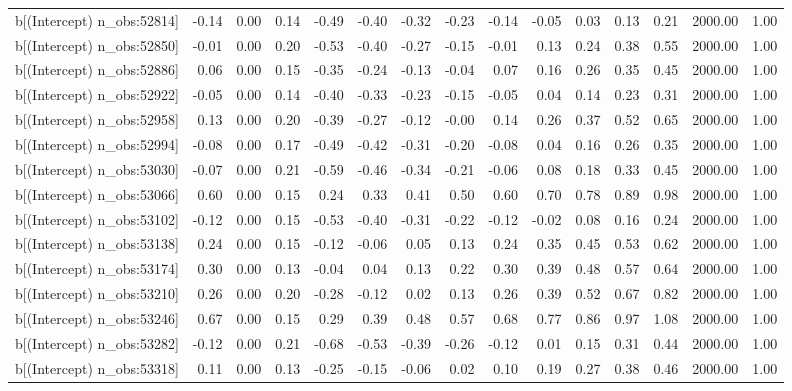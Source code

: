 \begin{table}[ht]
\begin{tabular}{rrrrrrrrrrrrrrr}
  b[(Intercept) n\_obs:52814] & -0.14 & 0.00 & 0.14 & -0.49 & -0.40 & -0.32 & -0.23 & -0.14 & -0.05 & 0.03 & 0.13 & 0.21 & 2000.00 & 1.00 \\ 
  b[(Intercept) n\_obs:52850] & -0.01 & 0.00 & 0.20 & -0.53 & -0.40 & -0.27 & -0.15 & -0.01 & 0.13 & 0.24 & 0.38 & 0.55 & 2000.00 & 1.00 \\ 
  b[(Intercept) n\_obs:52886] & 0.06 & 0.00 & 0.15 & -0.35 & -0.24 & -0.13 & -0.04 & 0.07 & 0.16 & 0.26 & 0.35 & 0.45 & 2000.00 & 1.00 \\ 
  b[(Intercept) n\_obs:52922] & -0.05 & 0.00 & 0.14 & -0.40 & -0.33 & -0.23 & -0.15 & -0.05 & 0.04 & 0.14 & 0.23 & 0.31 & 2000.00 & 1.00 \\ 
  b[(Intercept) n\_obs:52958] & 0.13 & 0.00 & 0.20 & -0.39 & -0.27 & -0.12 & -0.00 & 0.14 & 0.26 & 0.37 & 0.52 & 0.65 & 2000.00 & 1.00 \\ 
  b[(Intercept) n\_obs:52994] & -0.08 & 0.00 & 0.17 & -0.49 & -0.42 & -0.31 & -0.20 & -0.08 & 0.04 & 0.16 & 0.26 & 0.35 & 2000.00 & 1.00 \\ 
  b[(Intercept) n\_obs:53030] & -0.07 & 0.00 & 0.21 & -0.59 & -0.46 & -0.34 & -0.21 & -0.06 & 0.08 & 0.18 & 0.33 & 0.45 & 2000.00 & 1.00 \\ 
  b[(Intercept) n\_obs:53066] & 0.60 & 0.00 & 0.15 & 0.24 & 0.33 & 0.41 & 0.50 & 0.60 & 0.70 & 0.78 & 0.89 & 0.98 & 2000.00 & 1.00 \\ 
  b[(Intercept) n\_obs:53102] & -0.12 & 0.00 & 0.15 & -0.53 & -0.40 & -0.31 & -0.22 & -0.12 & -0.02 & 0.08 & 0.16 & 0.24 & 2000.00 & 1.00 \\ 
  b[(Intercept) n\_obs:53138] & 0.24 & 0.00 & 0.15 & -0.12 & -0.06 & 0.05 & 0.13 & 0.24 & 0.35 & 0.45 & 0.53 & 0.62 & 2000.00 & 1.00 \\ 
  b[(Intercept) n\_obs:53174] & 0.30 & 0.00 & 0.13 & -0.04 & 0.04 & 0.13 & 0.22 & 0.30 & 0.39 & 0.48 & 0.57 & 0.64 & 2000.00 & 1.00 \\ 
  b[(Intercept) n\_obs:53210] & 0.26 & 0.00 & 0.20 & -0.28 & -0.12 & 0.02 & 0.13 & 0.26 & 0.39 & 0.52 & 0.67 & 0.82 & 2000.00 & 1.00 \\ 
  b[(Intercept) n\_obs:53246] & 0.67 & 0.00 & 0.15 & 0.29 & 0.39 & 0.48 & 0.57 & 0.68 & 0.77 & 0.86 & 0.97 & 1.08 & 2000.00 & 1.00 \\ 
  b[(Intercept) n\_obs:53282] & -0.12 & 0.00 & 0.21 & -0.68 & -0.53 & -0.39 & -0.26 & -0.12 & 0.01 & 0.15 & 0.31 & 0.44 & 2000.00 & 1.00 \\ 
  b[(Intercept) n\_obs:53318] & 0.11 & 0.00 & 0.13 & -0.25 & -0.15 & -0.06 & 0.02 & 0.10 & 0.19 & 0.27 & 0.38 & 0.46 & 2000.00 & 1.00 \\ 

\end{tabular}
\end{table}
